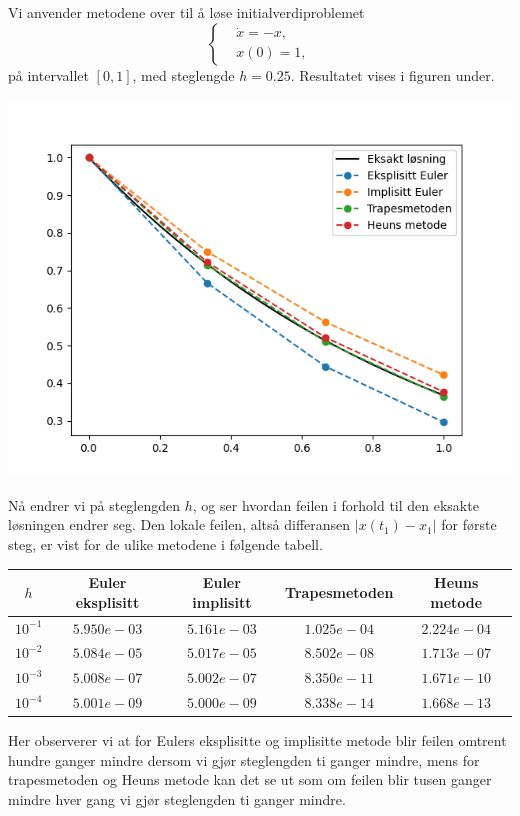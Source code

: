 \documentclass{article}
\theoremstyle{plain}
\theoremstyle{definition}
\theoremstyle{remark}
\newenvironment{ex}
{\pushQED{\qed}\renewcommand{\qedsymbol}{$\triangle$}\exx}
{\popQED\endexx}
\newcommand{\fcn}{x}
\newcommand{\abs}[1]{|#1|}
\begin{document}
\begin{ex} \label{eks:testproblem_numerikk}
    Vi anvender metodene over til å løse initialverdiproblemet
    \begin{equation*}
        \left\{ 
            \begin{aligned}
                & \dot{\fcn} = - \fcn, \\
                & \fcn(0) = 1,
            \end{aligned}
        \right.
    \end{equation*}
    på intervallet $[0, 1]$, med steglengde $h = 0.25$. Resultatet vises i figuren under.
    \begin{center}
        \includegraphics[scale=0.6]{methods_test.png}
    \end{center}
    Nå endrer vi på steglengden $h$, og ser hvordan feilen i forhold til den eksakte løsningen endrer seg. Den lokale feilen, altså differansen $\abs{\fcn(t_1) - \fcn_1}$ for første steg, er vist for de ulike metodene i følgende tabell.
    \begin{center}
        \begin{tabular}{c | c | c | c | c}
            $h$ & Euler eksplisitt & Euler implisitt & Trapesmetoden & Heuns metode \\
            \hline
            $10^{-1}$ & $5.950e-03$ & $5.161e-03$ & $1.025e-04$ & $2.224e-04$ \\
            $10^{-2}$ & $5.084e-05$ & $5.017e-05$ & $8.502e-08$ & $1.713e-07$ \\
            $10^{-3}$ & $5.008e-07$ & $5.002e-07$ & $8.350e-11$ & $1.671e-10$ \\
            $10^{-4}$ & $5.001e-09$ & $5.000e-09$ & $8.338e-14$ & $1.668e-13$
        \end{tabular}
    \end{center}
    Her observerer vi at for Eulers eksplisitte og implisitte metode blir feilen omtrent hundre ganger mindre dersom vi gjør steglengden ti ganger mindre, mens for trapesmetoden og Heuns metode kan det se ut som om feilen blir tusen ganger mindre hver gang vi gjør steglengden ti ganger mindre.


\end{ex}
\end{document}
